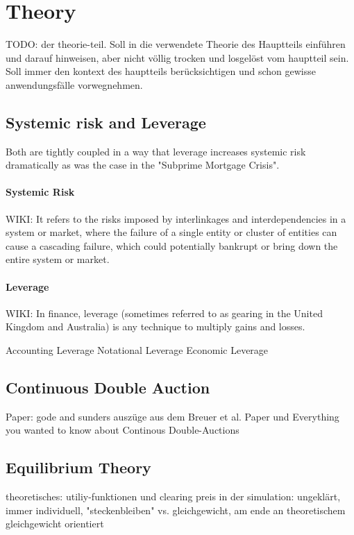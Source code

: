 \documentclass[../Bachelorarbeit.tex]{subfiles}
\begin{document}
\chapter{Theory}
TODO: der theorie-teil. Soll in die verwendete Theorie des Hauptteils einführen und darauf hinweisen, aber nicht völlig trocken und losgelöst vom hauptteil sein. Soll immer den kontext des hauptteils berücksichtigen und schon gewisse anwendungsfälle vorwegnehmen.

\section{Systemic risk and Leverage}
Both are tightly coupled in a way that leverage increases systemic risk dramatically as was the case in the "Subprime Mortgage Crisis".

\subsubsection{Systemic Risk}
WIKI: It refers to the risks imposed by interlinkages and interdependencies in a system or market, where the failure of a single entity or cluster of entities can cause a cascading failure, which could potentially bankrupt or bring down the entire system or market.

\cite{Milan2010}

\subsubsection{Leverage}
WIKI: In finance, leverage (sometimes referred to as gearing in the United Kingdom and Australia) is any technique to multiply gains and losses.

Accounting Leverage
Notational Leverage
Economic Leverage

\section{Continuous Double Auction}	
Paper: gode and sunders
auszüge aus dem Breuer et al. Paper und Everything you wanted to know about Continous Double-Auctions


\section{Equilibrium Theory}	
		theoretisches: utiliy-funktionen und clearing preis
		in der simulation: ungeklärt, immer individuell, "steckenbleiben" vs. gleichgewicht, am ende an theoretischem gleichgewicht orientiert
\end{document}
